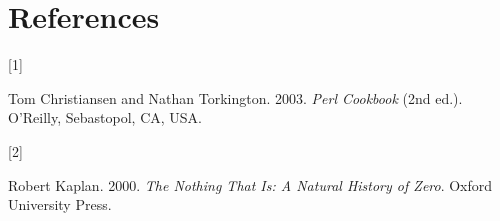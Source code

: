 \documentclass[
  a4paper,
]{article}
\newlength{\cslhangindent}
\newlength{\csllabelwidth}
\newlength{\cslentryspacingunit} %
\newenvironment{CSLReferences}[2] %
 {%
  \setlength{\parindent}{0pt}
  \ifodd #1
  \let\oldpar\par
  \def\par{\hangindent=\cslhangindent\oldpar}
  \fi
  \setlength{\parskip}{#2\cslentryspacingunit}
 }%
 {}
\newcommand{\CSLLeftMargin}[1]{\parbox[t]{\csllabelwidth}{#1}}
\newcommand{\CSLRightInline}[1]{\parbox[t]{\linewidth - \csllabelwidth}{#1}\break}
\begin{document}
\hypertarget{bibliography}{%
\section*{References}\label{bibliography}}

\hypertarget{refs}{}
\begin{CSLReferences}{0}{0}
\leavevmode{}%
\CSLLeftMargin{{[}1{]} }%
\CSLRightInline{Tom Christiansen and Nathan Torkington. 2003.
\emph{{Perl Cookbook}} (2nd ed.). O'Reilly, Sebastopol, CA, USA.}

\leavevmode{}%
\CSLLeftMargin{{[}2{]} }%
\CSLRightInline{Robert Kaplan. 2000. \emph{{The Nothing That Is: A
Natural History of Zero}}. Oxford University Press.}

\end{CSLReferences}
\end{document}
